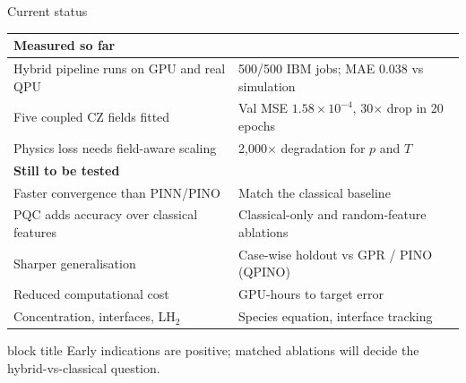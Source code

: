 \documentclass[aspectratio=169,10pt]{beamer}
\newcommand{\takeaway}[1]{%
  \vfill
  \begin{beamercolorbox}[rounded=true,shadow=false,wd=\linewidth,sep=4pt]{block title}
  \small\centering #1
  \end{beamercolorbox}}
\begin{document}
\begin{frame}{Current status}
\renewcommand{\arraystretch}{1.1}
\small
\begin{tabular}{p{} p{}}
\toprule
\multicolumn{2}{l}{\textcolor{okgreen}{\textbf{Measured so far}}} \\
\midrule
Hybrid pipeline runs on GPU and real QPU & 500/500 IBM jobs; MAE 0.038 vs simulation \\
Five coupled CZ fields fitted & Val MSE $1.58\times10^{-4}$, 30$\times$ drop in 20 epochs \\
Physics loss needs field-aware scaling & 2,000$\times$ degradation for $p$ and $T$ \\
\midrule
\multicolumn{2}{l}{\textcolor{warnorange}{\textbf{Still to be tested}}} \\
\midrule
Faster convergence than PINN/PINO & Match the classical baseline \\
PQC adds accuracy over classical features & Classical-only and random-feature ablations \\
Sharper generalisation & Case-wise holdout vs GPR / PINO (QPINO) \\
Reduced computational cost & GPU-hours to target error \\
Concentration, interfaces, LH$_2$ & Species equation, interface tracking \\
\bottomrule
\end{tabular}
\takeaway{Early indications are positive; matched ablations will decide the hybrid-vs-classical question.}
\end{frame}
\end{document}

